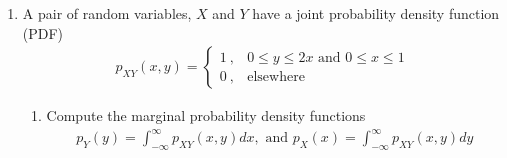 \documentclass[letterpaper,12pt]{article}
\begin{document}
\begin{enumerate}




\item

A pair of random variables, $X$ and $Y$ have a joint probability density function (PDF)
    \begin{align*}
        p_{XY}(x, y) = \begin{cases}
            1 \ , & 0 \leq y \leq 2x \text{ and } 0 \leq x \leq 1 \\
            0 \ , & \text{elsewhere}
        \end{cases}
    \end{align*}

\begin{enumerate}
    \item
    Compute the marginal probability density functions
    \begin{align*}
p_Y(y) = \int_{-\infty}^\infty p_{XY}(x, y)dx, \text{ and } p_X(x) = \int_{-\infty}^\infty p_{XY}(x, y)dy
    \end{align*}


\end{enumerate}
\end{enumerate}
\end{document}

